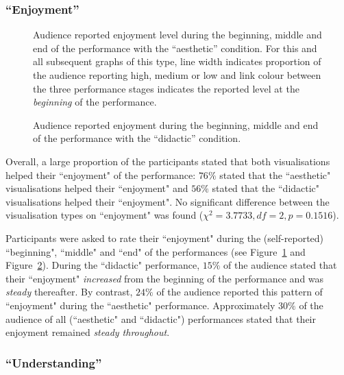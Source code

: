 \documentclass{sig-alternate}
\begin{document}
\subsubsection{``Enjoyment''}

\begin{figure}
\centering
{}
\caption{Audience reported enjoyment level during the beginning, middle and end of the performance with the ``aesthetic'' condition. For this and all subsequent graphs of this type, line width indicates proportion of the audience reporting high, medium or low and link colour between the three performance stages indicates the reported level at the \textit{beginning} of the performance.}
\label{fig:aesthetic-enjoyment}
\end{figure}

\begin{figure}
\centering
{}
\caption{Audience reported enjoyment during the beginning, middle and end of the performance with the ``didactic'' condition.}
\label{fig:didactic-enjoyment}
\end{figure}

Overall, a large proportion of the participants stated that both visualisations helped their ``enjoyment" of the performance: $76\%$ stated that the ``aesthetic" visualisations helped their ``enjoyment" and $56\%$ stated that the ``didactic" visualisations helped their ``enjoyment". No significant difference between the visualisation types on ``enjoyment" was found ($\chi^2=3.7733,df=2,p=0.1516$).

Participants were asked to rate their ``enjoyment" during the (self-reported) ``beginning", ``middle" and ``end" of the performances (see Figure~\ref{fig:aesthetic-enjoyment} and Figure~\ref{fig:didactic-enjoyment}). During the ``didactic" performance, $15\%$ of the audience stated that their ``enjoyment" \textit{increased} from the beginning of the performance and was \textit{steady} thereafter. By contrast, $24\%$ of the audience reported this pattern of ``enjoyment" during the ``aesthetic" performance. Approximately $30\%$ of the audience of all (``aesthetic" and ``didactic") performances stated that their enjoyment remained \textit{steady throughout}.

\subsubsection{``Understanding''}
\end{document}

